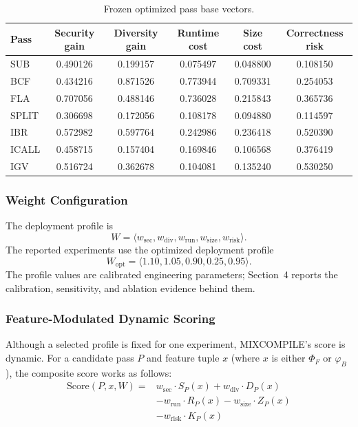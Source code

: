 \documentclass[5p,times,authoryear]{elsarticle}
\theoremstyle{plain}
\theoremstyle{definition}
\theoremstyle{remark}
\begin{document}
\begin{table}[!t]
\centering
\footnotesize
\caption{Frozen optimized pass base vectors.}
\label{tab:optimized_pass_vectors}
\begin{tabular}{lccccc}
\toprule
Pass & Security gain & Diversity gain & Runtime cost & Size cost & Correctness risk \\
\midrule
SUB   & 0.490126 & 0.199157 & 0.075497 & 0.048800 & 0.108150 \\
BCF   & 0.434216 & 0.871526 & 0.773944 & 0.709331 & 0.254053 \\
FLA   & 0.707056 & 0.488146 & 0.736028 & 0.215843 & 0.365736 \\
SPLIT & 0.306698 & 0.172056 & 0.108178 & 0.094880 & 0.114597 \\
IBR   & 0.572982 & 0.597764 & 0.242986 & 0.236418 & 0.520390 \\
ICALL & 0.458715 & 0.157404 & 0.169846 & 0.106568 & 0.376419 \\
IGV   & 0.516724 & 0.362678 & 0.104081 & 0.135240 & 0.530250 \\
\bottomrule
\end{tabular}
\end{table}

\subsubsection{Weight Configuration}

The deployment profile is
\begin{equation}
W = \langle w_{\mathrm{sec}}, w_{\mathrm{div}}, w_{\mathrm{run}},
w_{\mathrm{size}}, w_{\mathrm{risk}} \rangle .
\label{eq:weights}
\end{equation}
The reported experiments use the optimized deployment profile
\begin{equation}
W_{\mathrm{opt}}=\langle1.10,1.05,0.90,0.25,0.95\rangle .
\label{eq:optimized_weights}
\end{equation}
The profile values are calibrated engineering parameters; Section~4 reports the
calibration, sensitivity, and ablation evidence behind them.

\subsubsection{Feature-Modulated Dynamic Scoring}

Although a selected profile is fixed for one experiment, MIXCOMPILE's score is
dynamic. For a candidate pass $P$ and feature tuple $x$ (where $x$ is either $\Phi_F$
or $\varphi_B$), the composite score works as follows:
\begin{equation}
\begin{aligned}
\text{Score}(P, x, W) ={}& w_{\mathrm{sec}} \cdot S_P(x) + w_{\mathrm{div}} \cdot D_P(x) \\
 &- w_{\mathrm{run}} \cdot R_P(x) - w_{\mathrm{size}} \cdot Z_P(x) \\
 &- w_{\mathrm{risk}} \cdot K_P(x)
\end{aligned}
\label{eq:score}
\end{equation}
\end{document}
